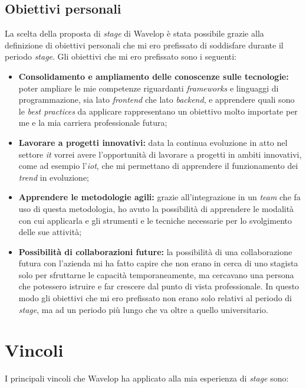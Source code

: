 \subsection{Obiettivi personali}
La scelta della proposta di \emph{stage} di Wavelop è stata possibile grazie alla definizione di obiettivi personali che mi ero prefissato di soddisfare durante il periodo \emph{stage}. 
Gli obiettivi che mi ero prefissato sono i seguenti:
\begin{itemize}
  \item \textbf{Consolidamento e ampliamento delle conoscenze sulle tecnologie:} poter ampliare le mie competenze riguardanti \emph{frameworks} e linguaggi di programmazione, sia lato \emph{\gls{frontend}} che lato \emph{\gls{backend}}, e apprendere quali sono le \emph{best practices} da applicare rappresentano un obiettivo molto importate per me e la mia carriera professionale futura;
  \item \textbf{Lavorare a progetti innovativi:} data la continua evoluzione in atto nel settore \emph{\acrshort{it}} vorrei avere l'opportunità di lavorare a progetti in ambiti innovativi, come ad esempio l'\emph{\acrlong{iot}}, che mi permettano di apprendere il funzionamento dei \emph{trend} in evoluzione;
  \item \textbf{Apprendere le metodologie agili:} grazie all'integrazione in un \emph{team} che fa uso di questa metodologia, ho avuto la possibilità di apprendere le modalità con cui applicarla e gli strumenti e le tecniche necessarie per lo svolgimento delle sue attività;
  \item \textbf{Possibilità di collaborazioni future:} la possibilità di una collaborazione futura con l'azienda mi ha fatto capire che non erano in cerca di uno stagista solo per sfruttarne le capacità temporaneamente, ma cercavano una persona che potessero istruire e far crescere dal punto di vista professionale. In questo modo gli obiettivi che mi ero prefissato non erano solo relativi al periodo di \emph{stage}, ma ad un periodo più lungo che va oltre a quello universitario.
\end{itemize}

\section{Vincoli}

I principali vincoli che Wavelop ha applicato alla mia esperienza di \emph{stage} sono:
